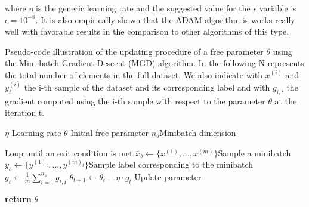 where $\eta$ is the generic learning rate and the suggested value for the $\epsilon$ variable is $\epsilon=10^{-8}$. It is also empirically shown that the ADAM algorithm is works really well with favorable results in the comparison to other algorithms of this type.

\begin{algorithm}[H]
\caption{Pseudo-code illustration of the updating procedure of a free parameter $\theta$ using the Mini-batch Gradient Descent (MGD) algorithm. In the following N represents the total number of elements in the full dataset. We also indicate with $x^{(i)}$ and $y^{(i)}_t$ the i-th sample of the dataset and its corresponding label and with $g_{i,t}$ the gradient computed using the i-th sample with respect to the parameter $\theta$ at the iteration t. }
\label{alg:mgd}
\begin{algorithmic}[1]
\Require $\eta$ \Comment Learning rate
\Require ${\theta}$ \Comment Initial free parameter
\Require $n_b$\Comment Minibatch dimension 

 \Comment Loop until an exit condition is met
\State $\bar{x}_b \gets \{x^{(1)},\dots,x^{(m)}\}$\Comment Sample a minibatch
\State $\bar{y}_b \gets \{y^{(1)_t},\dots,y^{(m)_t}\}$\Comment Sample label corresponding to the minibatch
\State ${g}_t \gets  \frac{1}{m} \sum_{i=1}^{n_b} g_{t,i}$ 
\State $\theta_{t+1} \gets \theta_t - \eta\cdot {g}_t$ \Comment Update parameter
\EndWhile

\State \textbf{return} ${\theta}$
\EndProcedure
\end{algorithmic}
\end{algorithm}




